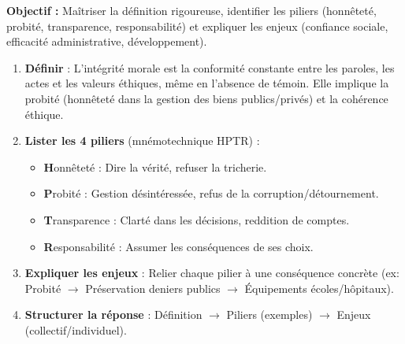 \documentclass[11pt]{article}
\newcommand{\cle}[1]{{\popxbold\color{popdark}#1}}
\begin{document}
\begin{methode}
    \textbf{Objectif :} Maîtriser la définition rigoureuse, identifier les piliers (honnêteté, probité, transparence, responsabilité) et expliquer les enjeux (confiance sociale, efficacité administrative, développement).
    \begin{enumerate}
        \item \textbf{Définir} : L'intégrité morale est la \cle{conformité constante entre les paroles, les actes et les valeurs éthiques}, même en l'absence de témoin. Elle implique la \cle{probité} (honnêteté dans la gestion des biens publics/privés) et la \cle{cohérence} éthique.
        \item \textbf{Lister les 4 piliers} (mnémotechnique \cle{HPTR}) :
            \begin{itemize}
                \item \textbf{H}onnêteté : Dire la vérité, refuser la tricherie.
                \item \textbf{P}robité : Gestion désintéressée, refus de la corruption/détournement.
                \item \textbf{T}ransparence : Clarté dans les décisions, reddition de comptes.
                \item \textbf{R}esponsabilité : Assumer les conséquences de ses choix.
            \end{itemize}
        \item \textbf{Expliquer les enjeux} : Relier chaque pilier à une conséquence concrète (ex: Probité $\rightarrow$ Préservation deniers publics $\rightarrow$ Équipements écoles/hôpitaux).
        \item \textbf{Structurer la réponse} : Définition $\rightarrow$ Piliers (exemples) $\rightarrow$ Enjeux (collectif/individuel).
    \end{enumerate}
\end{methode}
\end{document}
